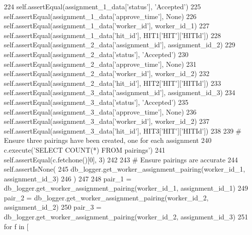 \begin{DoxyCode}
224         self.assertEqual(assignment\_1\_data[\textcolor{stringliteral}{'status'}], \textcolor{stringliteral}{'Accepted'})
225         self.assertEqual(assignment\_1\_data[\textcolor{stringliteral}{'approve\_time'}], \textcolor{keywordtype}{None})
226         self.assertEqual(assignment\_1\_data[\textcolor{stringliteral}{'worker\_id'}], worker\_id\_1)
227         self.assertEqual(assignment\_1\_data[\textcolor{stringliteral}{'hit\_id'}], HIT1[\textcolor{stringliteral}{'HIT'}][\textcolor{stringliteral}{'HITId'}])
228         self.assertEqual(assignment\_2\_data[\textcolor{stringliteral}{'assignment\_id'}], assignment\_id\_2)
229         self.assertEqual(assignment\_2\_data[\textcolor{stringliteral}{'status'}], \textcolor{stringliteral}{'Accepted'})
230         self.assertEqual(assignment\_2\_data[\textcolor{stringliteral}{'approve\_time'}], \textcolor{keywordtype}{None})
231         self.assertEqual(assignment\_2\_data[\textcolor{stringliteral}{'worker\_id'}], worker\_id\_2)
232         self.assertEqual(assignment\_2\_data[\textcolor{stringliteral}{'hit\_id'}], HIT2[\textcolor{stringliteral}{'HIT'}][\textcolor{stringliteral}{'HITId'}])
233         self.assertEqual(assignment\_3\_data[\textcolor{stringliteral}{'assignment\_id'}], assignment\_id\_3)
234         self.assertEqual(assignment\_3\_data[\textcolor{stringliteral}{'status'}], \textcolor{stringliteral}{'Accepted'})
235         self.assertEqual(assignment\_3\_data[\textcolor{stringliteral}{'approve\_time'}], \textcolor{keywordtype}{None})
236         self.assertEqual(assignment\_3\_data[\textcolor{stringliteral}{'worker\_id'}], worker\_id\_2)
237         self.assertEqual(assignment\_3\_data[\textcolor{stringliteral}{'hit\_id'}], HIT3[\textcolor{stringliteral}{'HIT'}][\textcolor{stringliteral}{'HITId'}])
238 
239         \textcolor{comment}{# Ensure three pairings have been created, one for each assignment}
240         c.execute(\textcolor{stringliteral}{'SELECT COUNT(*) FROM pairings'})
241         self.assertEqual(c.fetchone()[0], 3)
242 
243         \textcolor{comment}{# Ensure pairings are accurate}
244         self.assertIsNone(
245             db\_logger.get\_worker\_assignment\_pairing(worker\_id\_1, assignment\_id\_3)
246         )
247 
248         pair\_1 = db\_logger.get\_worker\_assignment\_pairing(worker\_id\_1, assignment\_id\_1)
249         pair\_2 = db\_logger.get\_worker\_assignment\_pairing(worker\_id\_2, assignment\_id\_2)
250         pair\_3 = db\_logger.get\_worker\_assignment\_pairing(worker\_id\_2, assignment\_id\_3)
251         \textcolor{keywordflow}{for} f \textcolor{keywordflow}{in} [

\end{DoxyCode}
